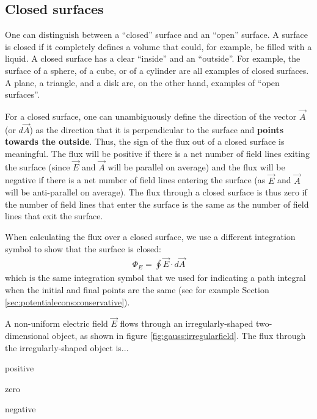 \subsection{Closed surfaces}
\label{sec:gauss:closedsurfaces}
One can distinguish between a ``closed'' surface and an ``open'' surface. A surface is closed if it completely defines a volume that could, for example, be filled with a liquid.  A closed surface has a clear ``inside'' and an ``outside''. For example, the surface of a sphere, of a cube, or of a cylinder are all examples of closed surfaces. A plane, a triangle, and a disk are, on the other hand, examples of ``open surfaces''.

For a closed surface, one can unambiguously define the direction of the vector $\vec A$ (or $d\vec A$) as the direction that it is perpendicular to the surface and \textbf{points towards the outside}. Thus, the sign of the flux out of a closed surface is meaningful. The flux will be positive if there is a net number of field lines exiting the surface (since $\vec E$ and $\vec A$ will be parallel on average) and the flux will be negative if there is a net number of field lines entering the surface (as $\vec E$ and $\vec A$ will be anti-parallel on average). The flux through a closed surface is thus zero if the number of field lines that enter the surface is the same as the number of field lines that exit the surface.

When calculating the flux over a closed surface, we use a different integration symbol to show that the surface is closed:
\begin{align*}
\Phi_E=\oint \vec E\cdot d\vec A
\end{align*}
which is the same integration symbol that we used for indicating a path integral when the initial and final points are the same (see for example Section \ref{sec:potentialecons:conservative}).


\begin{checkpoint}\label{cp:gauss:unitsofflux}
		\begin{MCquestion}{A non-uniform electric field $\vec E$ flows through an irregularly-shaped two-dimensional object, as shown in figure \ref{fig:gauss:irregularfield}. The flux through the irregularly-shaped object is...}
			\item positive
			
			\item zero \correct
			
			\item negative
		\end{MCquestion}
		
		
		
\end{checkpoint}

